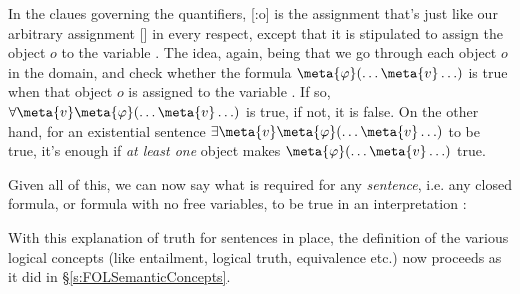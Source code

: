In the claues governing the quantifiers, [:o] is the assignment that's just like our arbitrary assignment [] in every respect, except that it is stipulated to assign the object $o$ to the variable .  The idea, again, being that we go through each object $o$ in the domain, and check whether the formula $\meta{\varphi}(\ldots \meta{v} \ldots)$ is true when that object $o$ is assigned to the variable .  If so, $\forall \meta{v}\meta{\varphi}(\ldots \meta{v} \ldots)$ is true, if not, it is false.  On the other hand, for an existential sentence $\exists \meta{v}\meta{\varphi}(\ldots \meta{v} \ldots)$ to be true, it's enough if \emph{at least one} object makes $\meta{\varphi}(\ldots \meta{v} \ldots)$ true.

Given all of this, we can now say what is required for any \emph{sentence}, i.e. any closed formula, or formula with no free variables, to be true in an interpretation :

With this explanation of truth for sentences in place, the definition of the various logical concepts (like entailment, logical truth, equivalence etc.) now proceeds as it did in \S\ref{s:FOLSemanticConcepts}.






